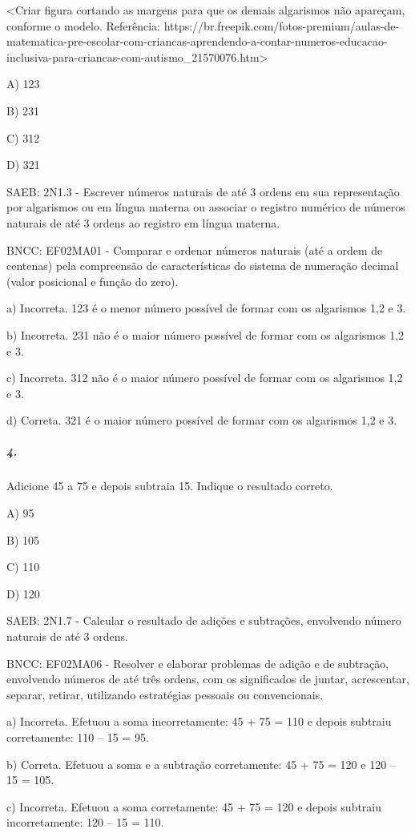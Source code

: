 \textless{}Criar figura cortando as margens para que os demais
algarismos não apareçam, conforme o modelo. Referência:
https://br.freepik.com/fotos-premium/aulas-de-matematica-pre-escolar-com-criancas-aprendendo-a-contar-numeros-educacao-inclusiva-para-criancas-com-autismo\_21570076.htm\textgreater{}

A) 123

B) 231

C) 312

D) 321

SAEB: 2N1.3 - Escrever números naturais de até 3 ordens em sua
representação por algarismos ou em língua materna ou associar o registro
numérico de números naturais de até 3 ordens ao registro em língua
materna.

BNCC: EF02MA01 - Comparar e ordenar números naturais (até a ordem de
centenas) pela compreensão de características do sistema de numeração
decimal (valor posicional e função do zero).

a) Incorreta. 123 é o menor número possível de formar com os algarismos
1,2 e 3.

b) Incorreta. 231 não é o maior número possível de formar com os
algarismos 1,2 e 3.

c) Incorreta. 312 não é o maior número possível de formar com os
algarismos 1,2 e 3.

d) Correta. 321 é o maior número possível de formar com os algarismos
1,2 e 3.

\subparagraph{4. }\label{section-103}

Adicione 45 a 75 e depois subtraia 15. Indique o resultado correto.

A) 95

B) 105

C) 110

D) 120

SAEB: 2N1.7 - Calcular o resultado de adições e subtrações, envolvendo
número naturais de até 3 ordens.

BNCC: EF02MA06 - Resolver e elaborar problemas de adição e de subtração,
envolvendo números de até três ordens, com os significados de juntar,
acrescentar, separar, retirar, utilizando estratégias pessoais ou
convencionais.

a) Incorreta. Efetuou a soma incorretamente: 45 + 75 = 110 e depois
subtraiu corretamente: 110 -- 15 = 95.

b) Correta. Efetuou a soma e a subtração corretamente: 45 + 75 = 120 e
120 -- 15 = 105.

c) Incorreta. Efetuou a soma corretamente: 45 + 75 = 120 e depois
subtraiu incorretamente: 120 -- 15 = 110.

